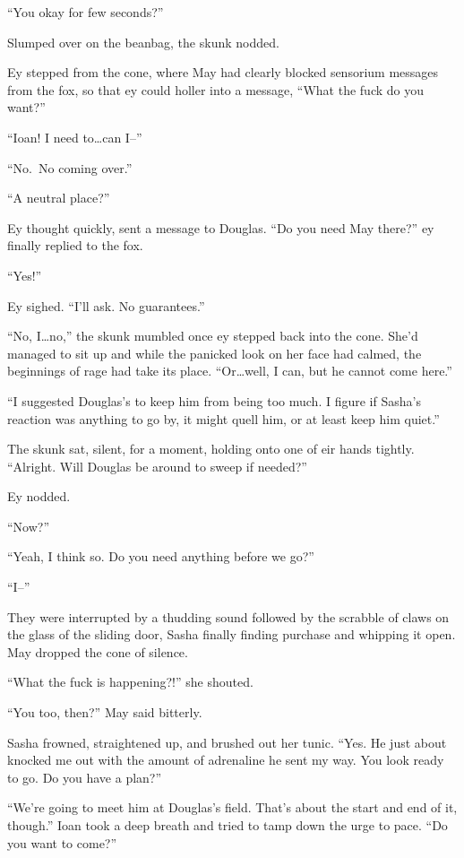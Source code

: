 ``You okay for few seconds?''

Slumped over on the beanbag, the skunk nodded.

Ey stepped from the cone, where May had clearly blocked sensorium messages from the fox, so that ey could holler into a message, ``What the fuck do you want?''

``Ioan! I need to\ldots can I--''

``No.~No coming over.''

``A neutral place?''

Ey thought quickly, sent a message to Douglas. ``Do you need May there?'' ey finally replied to the fox.

``Yes!''

Ey sighed. ``I'll ask. No guarantees.''

``No, I\ldots no,'' the skunk mumbled once ey stepped back into the cone. She'd managed to sit up and while the panicked look on her face had calmed, the beginnings of rage had take its place. ``Or\ldots well, I can, but he cannot come here.''

``I suggested Douglas's to keep him from being too much. I figure if Sasha's reaction was anything to go by, it might quell him, or at least keep him quiet.''

The skunk sat, silent, for a moment, holding onto one of eir hands tightly. ``Alright. Will Douglas be around to sweep if needed?''

Ey nodded.

``Now?''

``Yeah, I think so. Do you need anything before we go?''

``I--''

They were interrupted by a thudding sound followed by the scrabble of claws on the glass of the sliding door, Sasha finally finding purchase and whipping it open. May dropped the cone of silence.

``What the fuck is happening?!'' she shouted.

``You too, then?'' May said bitterly.

Sasha frowned, straightened up, and brushed out her tunic. ``Yes. He just about knocked me out with the amount of adrenaline he sent my way. You look ready to go. Do you have a plan?''

``We're going to meet him at Douglas's field. That's about the start and end of it, though.'' Ioan took a deep breath and tried to tamp down the urge to pace. ``Do you want to come?''

